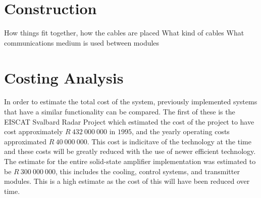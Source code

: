 \documentclass[11pt]{witseiepaper}
\begin{document}











\section{Construction} \label{sec:Construction}

How things fit together, how the cables are placed
What kind of cables
What communications medium is used between modules



\section{Costing Analysis} \label{sec:CostingAnalysis}

In order to estimate the total cost of the system, previously implemented systems that have a similar functionality can be compared. The first of these is the EISCAT Svalbard Radar Project \cite[p.~670]{EISCATPrice} which estimated the cost of the project to have cost approximately $R~432~000~000$ in $1995$, and the yearly operating costs approximated $R~40~000~000$. This cost is indicitave of the technology at the time and these costs will be greatly reduced with the use of newer efficient technology.
The estimate for the entire solid-state amplifier implementation was estimated to be $R~300~000~000$, this includes the cooling, control systems, and transmitter modules. This is a high estimate as the cost of this will have been reduced over time.
\end{document}
